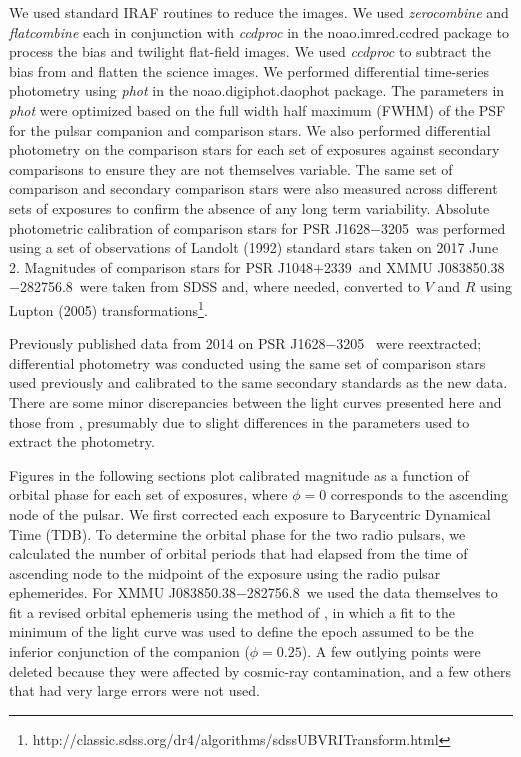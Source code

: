 \documentclass[iop]{emulateapj}
\newcommand{\mspone}{PSR J1628$-$3205}
\newcommand{\msptwo}{PSR J1048$+$2339}
\newcommand{\mspthree}{XMMU J083850.38$-$282756.8}
\begin{document}
We used standard IRAF routines to reduce the images. We used \textit{zerocombine}
and \textit{flatcombine} each in conjunction with \textit{ccdproc} in the noao.imred.ccdred
package to process the bias and twilight flat-field images. We used \textit{ccdproc} to
subtract the bias from and flatten the science images.
We performed differential time-series photometry using \textit{phot} in the noao.digiphot.daophot package. The
parameters in \textit{phot} were optimized based on the full width half maximum (FWHM) of the PSF for the pulsar companion and comparison stars. 
We also performed differential
photometry on the comparison stars for each set of exposures against secondary comparisons
to ensure they are not themselves variable. The same set of comparison and secondary
comparison stars were also measured across different sets of exposures to confirm
the absence of any long term variability.
Absolute photometric
calibration of comparison stars for \mspone\ was performed using a set of observations of
Landolt (1992) standard stars taken on 2017 June 2. Magnitudes of comparison stars for \msptwo\ and \mspthree\
were taken from SDSS and, where needed, converted to $V$ and $R$ using Lupton (2005) transformations\footnote{http://classic.sdss.org/dr4/algorithms/sdssUBVRITransform.html}.

Previously published data from 2014 on \mspone\ \citep{li14}
were reextracted; differential photometry was conducted using
the same set of comparison stars used previously
and calibrated to the same secondary standards as the new data.
There are some minor discrepancies between the light curves presented here
and those from \citep{li14}, presumably due to slight differences in the
parameters used to extract the photometry.

Figures in the following sections plot calibrated magnitude as a function
of orbital phase for each set of exposures, where $\phi=0$ corresponds
to the ascending node of the pulsar.  We first corrected each exposure to
Barycentric Dynamical Time (TDB).  To determine the orbital phase for the
two radio pulsars, we calculated the number of orbital periods that had
elapsed from the time of ascending node to the midpoint of the exposure
using the radio pulsar ephemerides.  For \mspthree\ we used the data themselves
to fit a revised orbital ephemeris using the method of \cite{hal17b}, in
which a fit to the minimum of the light curve was used to define the
epoch assumed to be the inferior conjunction of the companion ($\phi=0.25$).
A few outlying points were deleted because they were affected by cosmic-ray
contamination, and a few others that had very large errors were not used.
\end{document}
